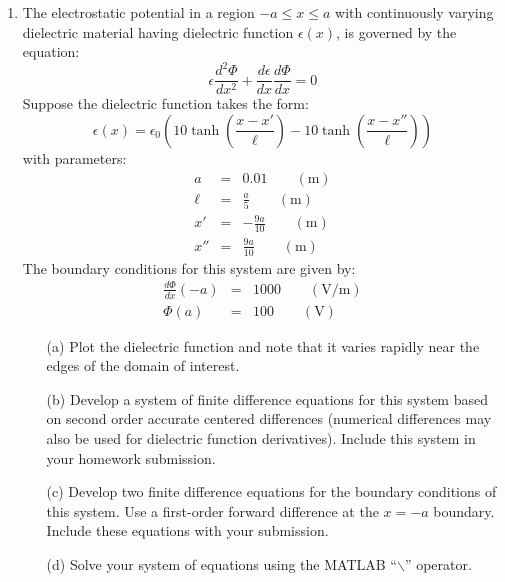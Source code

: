 \documentclass{article}
\begin{document}
\begin{enumerate}
  \item  The electrostatic potential in a region $-a \le x \le a$ with continuously varying dielectric material having dielectric function $\epsilon(x)$, is governed by the equation:  
  \begin{equation}
    \epsilon \frac{d^2 \Phi}{d x^2} + \frac{d \epsilon} {d x} \frac{d \Phi}{d x} = 0 
  \end{equation}
  Suppose the dielectric function takes the form:
  \begin{equation}
    \epsilon(x) = \epsilon_0 \left( 10 \tanh \left( \frac{x-x'}{\ell}\right) - 10 \tanh \left( \frac{x-x''}{\ell}\right) \right)
  \end{equation} 
  with parameters:
  \begin{eqnarray}
  a &=& 0.01 \qquad (\mathrm{m}) \nonumber \\
  \ell &=& \frac{a}{5} \qquad (\mathrm{m}) \nonumber \\
  x' &=& -\frac{9a}{10} \qquad (\mathrm{m}) \nonumber \\
  x'' &=& \frac{9a}{10} \qquad (\mathrm{m}) \nonumber  
  \end{eqnarray}  
  The boundary conditions for this system are given by:
  \begin{eqnarray}
  \frac{d \Phi}{d x}(-a) &=& 1000 \qquad (\mathrm{V/m}) \nonumber \\
  \Phi(a) &=& 100 \qquad (\mathrm{V}) \nonumber
  \end{eqnarray}     
  \begin{itemize}
    \item[(a)]  Plot the dielectric function and note that it varies rapidly near the edges of the domain of interest.
    \item[(b)]  Develop a system of finite difference equations for this system based on second order accurate centered differences (numerical differences may also be used for dielectric function derivatives).  Include this system in your homework submission.
    \item[(c)]  Develop two finite difference equations for the boundary conditions of this system.  Use a first-order forward difference at the $x=-a$ boundary.  Include these equations with your submission.  
    \item[(d)]  Solve your system of equations using the MATLAB ``$\backslash$'' operator.

\end{itemize}
\end{enumerate}
\end{document}

